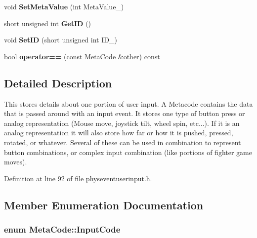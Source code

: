 \begin{DoxyCompactItemize}
\item 
\hypertarget{classMetaCode_a308404d4eb64627d02ab41dd5029c9c8}{
void {\bfseries SetMetaValue} (int MetaValue\_\-)}
\label{d7/d72/classMetaCode_a308404d4eb64627d02ab41dd5029c9c8}

\item 
\hypertarget{classMetaCode_a4556130570fdc8bf531be7f15519fafe}{
short unsigned int {\bfseries GetID} ()}
\label{d7/d72/classMetaCode_a4556130570fdc8bf531be7f15519fafe}

\item 
\hypertarget{classMetaCode_ae39bd781449cc01d7bce48c1e9da089d}{
void {\bfseries SetID} (short unsigned int ID\_\-)}
\label{d7/d72/classMetaCode_ae39bd781449cc01d7bce48c1e9da089d}

\item 
\hypertarget{classMetaCode_a296b774682a9326494e0c2d1b357ec2a}{
bool {\bfseries operator==} (const \hyperlink{classMetaCode}{MetaCode} \&other) const }
\label{d7/d72/classMetaCode_a296b774682a9326494e0c2d1b357ec2a}

\end{DoxyCompactItemize}


\subsection{Detailed Description}
This stores details about one portion of user input. A Metacode contains the data that is passed around with an input event. It stores one type of button press or analog representation (Mouse move, joystick tilt, wheel spin, etc...). If it is an analog representation it will also store how far or how it is pushed, pressed, rotated, or whatever. Several of these can be used in combination to represent button combinations, or complex input combination (like portions of fighter game moves). 

Definition at line 92 of file physeventuserinput.h.

\subsection{Member Enumeration Documentation}
\hypertarget{classMetaCode_a7390e6f58e25c0ce377bba4e63081b24}{
\subsubsection[{InputCode}]{\setlength{\rightskip}{0pt plus 5cm}enum {\bf MetaCode::InputCode}}}
\label{d7/d72/classMetaCode_a7390e6f58e25c0ce377bba4e63081b24}


